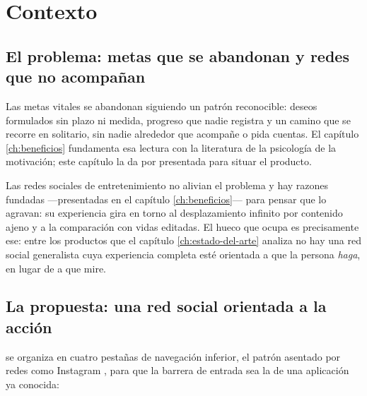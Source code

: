 
\chapter{Contexto}
\label{ch:contexto}

\section{El problema: metas que se abandonan y redes que no acompañan}
\label{sec:contexto-problema}

Las metas vitales se abandonan siguiendo un patrón reconocible: deseos formulados sin plazo ni medida, progreso que nadie registra y un camino que se recorre en solitario, sin nadie alrededor que acompañe o pida cuentas.
El capítulo \ref{ch:beneficios} fundamenta esa lectura con la literatura de la psicología de la motivación; este capítulo la da por presentada para situar el producto.

Las redes sociales de entretenimiento no alivian el problema y hay razones fundadas —presentadas en el capítulo \ref{ch:beneficios}— para pensar que lo agravan: su experiencia gira en torno al desplazamiento infinito por contenido ajeno y a la comparación con vidas editadas.
El hueco que \bukit ocupa es precisamente ese: entre los productos que el capítulo \ref{ch:estado-del-arte} analiza no hay una red social generalista cuya experiencia completa esté orientada a que la persona \emph{haga}, en lugar de a que mire.

\section{La propuesta: una red social orientada a la acción}
\label{sec:contexto-propuesta}

\bukit se organiza en cuatro pestañas de navegación inferior, el patrón asentado por redes como Instagram \parencite{instagram-app}, para que la barrera de entrada sea la de una aplicación ya conocida:

